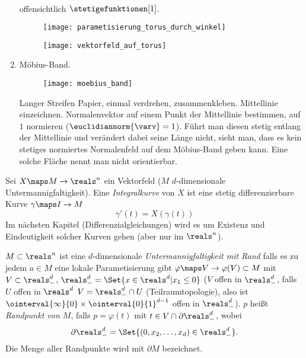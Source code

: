 \begin{beispiele*}
\begin{enumerate}
\begin{gather*}
  \end{gather*}
  offensichtlich \( \stetigefunktionen[1] \).
  \begin{figure}[H]
    \centering
    \texttt{[image: parametisierung\_torus\_durch\_winkel]}
    \label{fig:parametisierung_torus_durch_winkel}
  \end{figure}
  \begin{figure}[H]
    \centering
    \texttt{[image: vektorfeld\_auf\_torus]}
    \label{fig:vektorfeld_auf_torus}
  \end{figure}
  \item Möbius-Band. 
  \begin{figure}[H]
    \centering
    \texttt{[image: moebius\_band]}
    \label{fig:moebius_band}
  \end{figure}
  Langer Streifen Papier, einmal verdrehen, zusammenkleben. Mittellinie einzeichnen. Normalenvektor auf einem Punkt der Mittellinie bestimmen, auf \( 1 \) normieren (\( \euclidiannorm{\varv}=1 \)). Führt man diesen stetig entlang der Mittellinie und verändert dabei seine Länge nicht, sieht man, dass es kein stetiges normiertes Normalenfeld auf dem Möbius-Band geben kann. Eine solche Fläche nennt man nicht orientierbar. 
  \end{enumerate}
\end{beispiele*}
\begin{definition}
  Sei \( X\maps M\to \reals^n  \) ein Vektorfeld (\( M \) \( d \)-dimensionale Untermannigfaltigkeit). Eine \emph{Integralkurve} von \( X \) ist eine stetig differenzierbare Kurve \( \gamma\maps I\to M \) \sd
  \begin{equation*}
    \gamma'(t)=X(\gamma(t))
  \end{equation*}
  Im nächsten Kapitel (Differenzialgleichungen) wird es um Existenz und Eindeutigkeit solcher Kurven gehen (aber nur im \( \reals^n \)).
\end{definition}
\begin{definition}\label{untermannigfaltigkeit_mit_rand}
  \( M\subset \reals^n \) ist eine \( d \)-dimensionale \emph{Untermannigfaltigkeit mit Rand} falls es zu jedem \( a\in M \) eine lokale Parametisierung gibt \( \varphi\maps V\to \varphi(V)\subset M \) mit \( V\subset \reals^d_{-} \), \( \reals^d_{-}=\Set{x\in \reals^d|x_1\leq 0} \) (\( V \) offen in \( \reals^d_{-} \), falls \texists  \( U \) offen in \( \reals^d \) \sd \( V=\reals^d_{-}\cap U \) (Teilraumtopologie), also \zb ist \( \ointerval{\infty}{0}\times \ointerval{0}{1}^{d-1} \) offen in \( \reals^{d}_{-} \)). \( p \) heißt \emph{Randpunkt von \( M \)}, falls \( p=\varphi(t) \) mit \( t\in V\cap \partial \reals^d_{-} \), wobei
  \begin{equation*}
    \partial \reals^d_{-}=\Set{(0,x_2,\dotsc,x_{d})\in \reals^d_{-}}.
  \end{equation*}
  Die Menge aller Randpunkte wird mit \( \partial M \) bezeichnet.
\end{definition}
